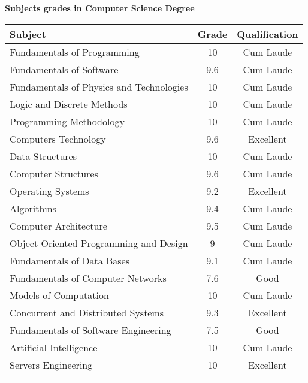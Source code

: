 \documentclass[10pt,a4paper,sans]{moderncv} %
\begin{document}
	\centerline{\textbf{Subjects grades in Computer Science Degree}}
	\kern 2mm
	\centering \begin{tabular}{lcc}
		\toprule
		\textbf{Subject} & \textbf{ Grade } & \textbf{ Qualification}     \\
		\midrule
		Fundamentals of Programming                   & 10   & Cum Laude  \\ 
		Fundamentals of Software                      & 9.6  & Cum Laude  \\
		Fundamentals of Physics and Technologies      & 10   & Cum Laude  \\ 
		Logic and Discrete Methods                    & 10   & Cum Laude  \\
		Programming Methodology                       & 10   & Cum Laude  \\
		Computers Technology                          & 9.6  & Excellent   \\
		Data Structures                               & 10   & Cum Laude  \\
		Computer Structures                           & 9.6  & Cum Laude  \\
		Operating Systems                             & 9.2  & Excellent   \\
		Algorithms                                    & 9.4  & Cum Laude  \\
		Computer Architecture                         & 9.5  & Cum Laude  \\
		Object-Oriented Programming and Design        & 9    & Cum Laude  \\    
		Fundamentals of Data Bases                    & 9.1  & Cum Laude  \\ 
		Fundamentals of Computer Networks             & 7.6  & Good       \\
		Models of Computation                         & 10   & Cum Laude  \\
		Concurrent and Distributed Systems            & 9.3  & Excellent   \\
		Fundamentals of Software Engineering          & 7.5  & Good       \\
		Artificial Intelligence                       & 10   & Cum Laude  \\
		Servers Engineering                           & 10   & Excellent  \\
		\bottomrule
		\\
	\end{tabular}
	
	\pagebreak
	
\end{document}
